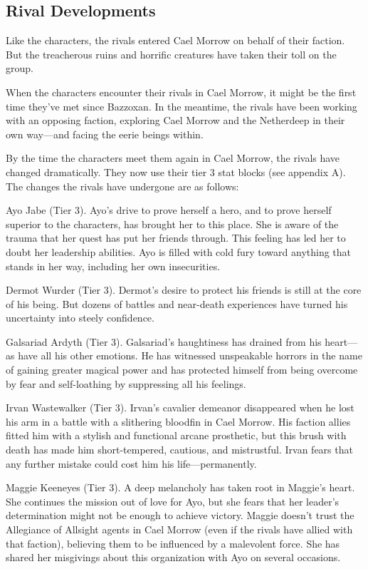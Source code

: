 \documentclass[10pt,a4paper,twoside,bg=print,twocolumn,openany,nodeprecatedcode]{dndbook}
\begin{document}
\subsection{Rival Developments}
Like the characters, the rivals entered Cael Morrow on behalf of their faction. But the treacherous ruins and horrific creatures have taken their toll on the group.

When the characters encounter their rivals in Cael Morrow, it might be the first time they've met since Bazzoxan. In the meantime, the rivals have been working with an opposing faction, exploring Cael Morrow and the Netherdeep in their own way—and facing the eerie beings within.

By the time the characters meet them again in Cael Morrow, the rivals have changed dramatically. They now use their tier 3 stat blocks (see appendix A). The changes the rivals have undergone are as follows:

Ayo Jabe (Tier 3). Ayo's drive to prove herself a hero, and to prove herself superior to the characters, has brought her to this place. She is aware of the trauma that her quest has put her friends through. This feeling has led her to doubt her leadership abilities. Ayo is filled with cold fury toward anything that stands in her way, including her own insecurities.

Dermot Wurder (Tier 3). Dermot's desire to protect his friends is still at the core of his being. But dozens of battles and near-death experiences have turned his uncertainty into steely confidence.

Galsariad Ardyth (Tier 3). Galsariad's haughtiness has drained from his heart—as have all his other emotions. He has witnessed unspeakable horrors in the name of gaining greater magical power and has protected himself from being overcome by fear and self-loathing by suppressing all his feelings.

Irvan Wastewalker (Tier 3). Irvan's cavalier demeanor disappeared when he lost his arm in a battle with a slithering bloodfin in Cael Morrow. His faction allies fitted him with a stylish and functional arcane prosthetic, but this brush with death has made him short-tempered, cautious, and mistrustful. Irvan fears that any further mistake could cost him his life—permanently.

Maggie Keeneyes (Tier 3). A deep melancholy has taken root in Maggie's heart. She continues the mission out of love for Ayo, but she fears that her leader's determination might not be enough to achieve victory. Maggie doesn't trust the Allegiance of Allsight agents in Cael Morrow (even if the rivals have allied with that faction), believing them to be influenced by a malevolent force. She has shared her misgivings about this organization with Ayo on several occasions.
\end{document}
